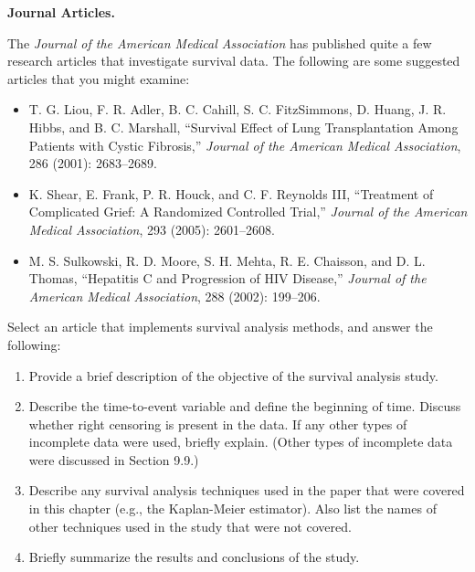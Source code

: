 \documentclass[
]{report}
\begin{document}
\begin{list}{E.}{ \setlength{\itemsep}{1.2em}}

  \item \textbf{Journal Articles.}

The \textit{Journal of the American Medical Association} has published quite a few research articles that investigate survival data. The following are some suggested articles that you might examine:
\begin{itemize}
  \item T. G. Liou, F. R. Adler, B. C. Cahill, S. C. FitzSimmons, D. Huang, J. R. Hibbs, and B. C. Marshall, ``Survival Effect of Lung Transplantation Among Patients with Cystic Fibrosis,'' \textit{Journal of the American Medical Association}, 286 (2001): 2683–2689.
  \item K. Shear, E. Frank, P. R. Houck, and C. F. Reynolds III, ``Treatment of Complicated Grief: A Randomized Controlled Trial,'' \textit{Journal of the American Medical Association}, 293 (2005): 2601–2608.
  \item M. S. Sulkowski, R. D. Moore, S. H. Mehta, R. E. Chaisson, and D. L. Thomas, ``Hepatitis C and Progression of HIV Disease,'' \textit{Journal of the American Medical Association}, 288 (2002): 199–206.
\end{itemize}

Select an article that implements survival analysis methods, and answer the following:
  \begin{enumerate}
    \item Provide a brief description of the objective of the survival analysis study.
    \item Describe the time-to-event variable and define the beginning of time. Discuss whether right censoring is present in the data. If any other types of incomplete data were used, briefly explain. (Other types of incomplete data were discussed in Section 9.9.)
    \item Describe any survival analysis techniques used in the paper that were covered in this chapter (e.g., the Kaplan-Meier estimator). Also list the names of other techniques used in the study that were not covered.
    \item Briefly summarize the results and conclusions of the study.
  \end{enumerate}


\end{list}
\end{document}
